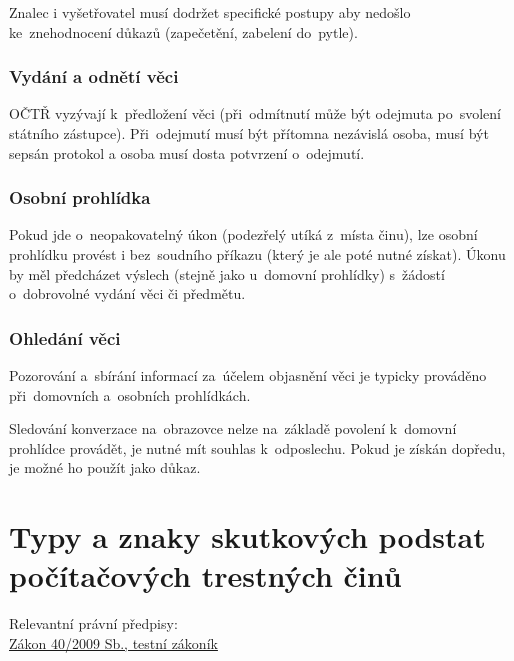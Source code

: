 Znalec i vyšetřovatel musí dodržet specifické postupy aby nedošlo ke~znehodnocení důkazů (zapečetění, zabelení do~pytle).

\subsubsection{Vydání a odnětí věci}

OČTŘ vyzývají k~předložení věci (při~odmítnutí může být odejmuta po~svolení státního zástupce).
Při~odejmutí musí být přítomna nezávislá osoba, musí být sepsán protokol a osoba musí dosta potvrzení o~odejmutí.


\subsubsection{Osobní prohlídka}

Pokud jde o~neopakovatelný úkon (podezřelý utíká z~místa činu), lze osobní prohlídku provést i bez~soudního příkazu (který je ale poté nutné získat).
Úkonu by měl předcházet výslech (stejně jako u~domovní prohlídky) s~žádostí o~dobrovolné vydání věci či předmětu.


\subsubsection{Ohledání věci}

Pozorování a~sbírání informací za~účelem objasnění věci je typicky prováděno při~domovních a~osobních prohlídkách.

Sledování konverzace na~obrazovce nelze na~základě povolení k~domovní prohlídce provádět, je nutné mít souhlas k~odposlechu.
Pokud je získán dopředu, je možné ho použít jako důkaz.


\clearpage
\section{Typy a znaky skutkových podstat počítačových trestných činů}


{}Relevantní právní předpisy:
\\\href{https://www.zakonyprolidi.cz/cs/2009-40}{Zákon 40/2009 Sb., testní zákoník}

